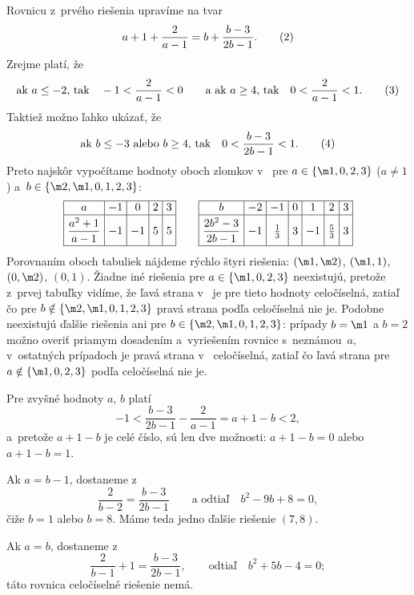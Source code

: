 {\ineriesenie
Rovnicu  z~prvého riešenia upravíme na tvar
$$
a+1+\frac2{a-1}=b+\frac{b-3}{2b-1}.\tag2
$$
Zrejme platí, že
$$
\text{ak $a\le-2$, tak}\quad -1<\frac2{a-1}<0\qquad
\text{a~ak $a\ge4$, tak}\quad 0<\frac2{a-1}<1.
\tag3
$$
Taktiež možno ľahko ukázať, že
$$
\text{ak $b\le-3$ alebo $b\ge4$, tak}\quad 0<\frac{b-3}{2b-1}<1.
\tag4
$$
Preto najskôr vypočítame hodnoty oboch zlomkov v~ pre $a\in\{\m1,0,2,3\}$ ($a\ne1$) a~$b\in\{\m2,\m1,0,1,2,3\}$:
$$
\hbox{\vbox{\offinterlineskip
  \everycr{\noalign{\hrule}}
\halign{\strut\vrule#&~\hfil$#$\hfil~\vrule&&~\hfil$#$\hfil~\vrule\cr
&a&-1&0&2&3\cr      height17pt depth10pt
&\dfrac{a^2+1}{a-1}&-1&-1&5&5\cr
}}\qquad
\vbox{\offinterlineskip
  \everycr{\noalign{\hrule}}
\halign{\strut\vrule#&~\hfil$#$\hfil~\vrule&&~\hfil$#$\hfil~\vrule\cr
&b&-2&-1&0&1&2&3\cr    height17pt depth10pt
&\dfrac{2b^2-3}{2b-1}&-1&\frac13&3&-1&\frac53&3\cr
}}}
$$
Porovnaním oboch tabuliek nájdeme rýchlo štyri riešenia: $(\m1,\m2)$, $(\m1,1)$, $(0,\m2)$, $(0,1)$. Žiadne iné riešenia pre $a\in\{\m1,0,2,3\}$ neexistujú, pretože z~prvej tabuľky vidíme, že ľavá strana v~ je pre tieto hodnoty celočíselná, zatiaľ čo pre $b\notin\{\m2,\m1,0,1,2,3\}$ pravá strana podľa  celočíselná nie je. Podobne neexistujú ďalšie riešenia ani pre $b\in\{\m2,\m1,0,1,2,3\}$: prípady $b=\m1$ a $b=2$ možno overiť priamym dosadením a~vyriešením rovnice s~neznámou~$a$, v~ostatných prípadoch je pravá strana v~ celočíselná, zatiaľ čo ľavá strana pre  $a\notin\{\m1,0,2,3\}$ podľa  celočíselná nie je.

Pre zvyšné hodnoty $a$, $b$ platí
$$
-1<\frac{b-3}{2b-1}-\frac2{a-1}=a+1-b<2,
$$
a~pretože $a+1-b$
je celé číslo, sú len dve možnosti: $a+1-b=0$ alebo $a+1-b=1$.

Ak $a=b-1$, dostaneme z~
$$
\frac2{b-2}=\frac{b-3}{2b-1}\qquad\text{a odtiaľ}\quad b^2-9b+8=0,
$$
čiže $b=1$ alebo $b=8$. Máme teda jedno ďalšie riešenie $(7,8)$.

Ak $a=b$, dostaneme z~
$$\frac2{b-1}+1=\frac{b-3}{2b-1},\qquad\text{odtiaľ}\quad b^2+5b-4=0;
$$
táto rovnica celočíselné riešenie nemá.
}

